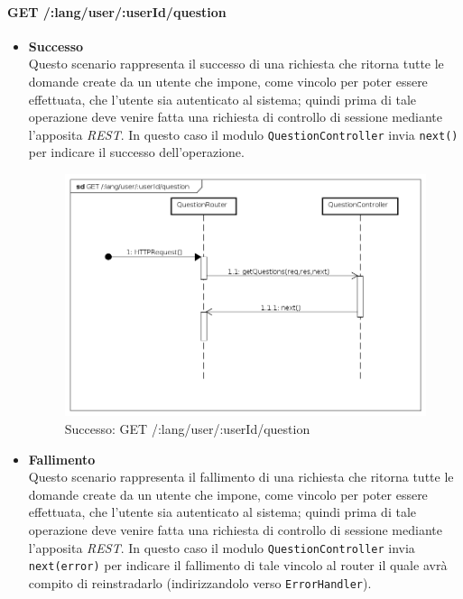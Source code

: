 
\paragraph{GET /:lang/user/:userId/question}
\begin{itemize}
\item \textbf{Successo}\\
Questo scenario rappresenta il successo di una richiesta che ritorna tutte le domande create da un utente che impone, come vincolo per poter essere effettuata, che l'utente sia autenticato al sistema; quindi prima di tale operazione deve venire fatta una richiesta di controllo di sessione mediante l'apposita \textit{REST}. In questo caso il modulo \texttt{QuestionController} invia \texttt{next()} per indicare il successo dell'operazione.

\begin{figure}[ht]
	\centering
	\includegraphics[scale=0.45]{UML/DiagrammiDiSequenza/Back-end/GET__lang_user__userId_question_success.png}
	\caption{Successo: GET /:lang/user/:userId/question}
\end{figure}
\FloatBarrier

\item \textbf{Fallimento}\\
Questo scenario rappresenta il fallimento di una richiesta che ritorna tutte le domande create da un utente che impone, come vincolo per poter essere effettuata, che l'utente sia autenticato al sistema; quindi prima di tale operazione deve venire fatta una richiesta di controllo di sessione mediante l'apposita \textit{REST}. In questo caso il modulo \texttt{QuestionController} invia \texttt{next(error)} per indicare il fallimento di tale vincolo al router il quale avrà compito di reinstradarlo (indirizzandolo verso \texttt{ErrorHandler}).


\end{itemize}
